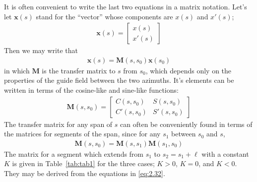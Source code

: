 It is often convenient to write the last two equations in a matrix notation. Let's let $\boldsymbol{x}(s)$ stand for the “vector” whose components are $x(s)$ and $x'(s)$;
\begin{align}
	\boldsymbol{x}(s) = \begin{bmatrix}
	x(s)\\
	x'(s)
	\end{bmatrix}
\end{align}
Then we may write that
\begin{align}
	\boldsymbol{x}(s)=\boldsymbol{M}(s,s_0)\boldsymbol{x}(s_0)
\end{align}
in which $\boldsymbol{M}$ is the transfer matrix to $s$ from $s_0$, which depends only on the properties of the guide field between the two azimuths. It's elements can be written in terms of the cosine-like and sine-like functions:
\begin{align}
	\boldsymbol{M}(s,s_0) = \begin{bmatrix}
	C(s,s_0) & S(s,s_0)\\
	C'(s,s_0) & S'(s,s_0)
	\end{bmatrix}\label{eq:2.37}
\end{align}
The transfer matrix for any span of $s$ can often be conveniently found in terms of the matrices for segments of the span, since for any $s_1$ between $s_0$ and $s$,
\begin{align}
	\boldsymbol{M}(s,s_0) = \boldsymbol{M}(s,s_1)\boldsymbol{M}(s_1,s_0)
\end{align}
The matrix for a segment which extends from $s_1$ to $s_2 = s_1 + \ell$ with a constant $K$ is given in Table~\ref{tab:tab1} for the three cases; $K > 0$, $K = 0$, and $K < 0$. They may be derived from the equations in \eqref{eq:2.32}.

